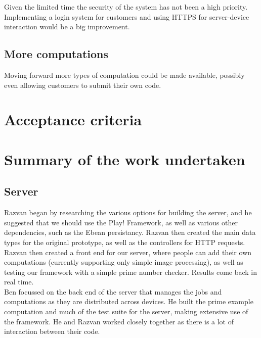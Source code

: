 \documentclass[a4paper,10pt]{article}
\begin{document}
Given the limited time the security of the system has not been a high priority.
Implementing a login system for customers and using HTTPS for server-device interaction would be a big improvement.

\subsection{More computations}

Moving forward more types of computation could be made available, possibly even allowing customers to submit their own code.





\section{Acceptance criteria}


\section{Summary of the work undertaken}

\subsection{Server}



Razvan began by researching the various options for building the server, and he suggested that we should use the Play! Framework, as well as various other dependencies, such as the Ebean persistancy. Razvan then created the main data types for the original prototype, as well as the controllers for HTTP requests. 
Razvan then created a front end for our server, where people can add their own computations (currently supporting only simple image processing), as well as testing our framework with a simple  prime number checker. Results come back in real time.\\

Ben focussed on the back end of the server that manages the jobs and computations as they are distributed across devices.
He built the prime example computation and much of the test suite for the server, making extensive use of the framework.
He and Razvan worked closely together as there is a lot of interaction between their code.
\end{document}
